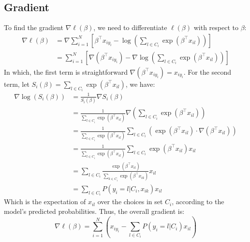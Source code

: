 \documentclass[11pt, a4paper, oneside]{memoir}
\begin{document}
\subsection{Gradient}
To find the gradient $\nabla\ell(\beta)$, we need to differentiate $\ell(\beta)$ with respect to $\beta$:
\begin{align*}
    \nabla\ell(\beta) & = \nabla \sum_{i=1}^{N} \left[ \beta^\top x_{iy_i} - \log \left( \sum_{l \in C_i} \exp(\beta^\top x_{il}) \right) \right]         \\
                      & = \sum_{i=1}^{N} \left[ \nabla(\beta^\top x_{iy_i}) - \nabla \log \left( \sum_{l \in C_i} \exp(\beta^\top x_{il}) \right) \right]
\end{align*}
In which, the first term is straightforward $\nabla(\beta^\top x_{iy_i}) = x_{iy_i}$.
For the second term, let $S_i(\beta) = \sum_{l \in C_i} \exp(\beta^\top x_{il})$, we have:
\begin{align*}
    \nabla \log(S_i(\beta)) & = \frac{1}{S_i(\beta)} \nabla S_i(\beta)                                                                                                     \\
                            & = \frac{1}{\sum_{l \in C_i} \exp(\beta^\top x_{il})} \nabla \left( \sum_{l \in C_i} \exp(\beta^\top x_{il}) \right)                          \\
                            & = \frac{1}{\sum_{l \in C_i} \exp(\beta^\top x_{il})} \sum_{l \in C_i} \left( \exp(\beta^\top x_{il}) \cdot \nabla(\beta^\top x_{il}) \right) \\
                            & = \frac{1}{\sum_{l \in C_i} \exp(\beta^\top x_{il})} \sum_{l \in C_i} \exp(\beta^\top x_{il}) x_{il}                                         \\
                            & = \sum_{l \in C_i} \frac{\exp(\beta^\top x_{il})}{\sum_{k \in C_i} \exp(\beta^\top x_{ik})} x_{il}                                           \\
                            & = \sum_{l \in C_i} P(y_i = l | C_i, {x_{ik}}) x_{il}
\end{align*}
Which is the expectation of $x_{il}$ over the choices in set $C_i$, according to the model's predicted probabilities.
Thus, the overall gradient is:
\[ \nabla\ell(\beta) = \sum_{i=1}^{N} \left( x_{iy_i} - \sum_{l \in C_i} P(y_i = l | C_i) x_{il} \right) \]
\end{document}
